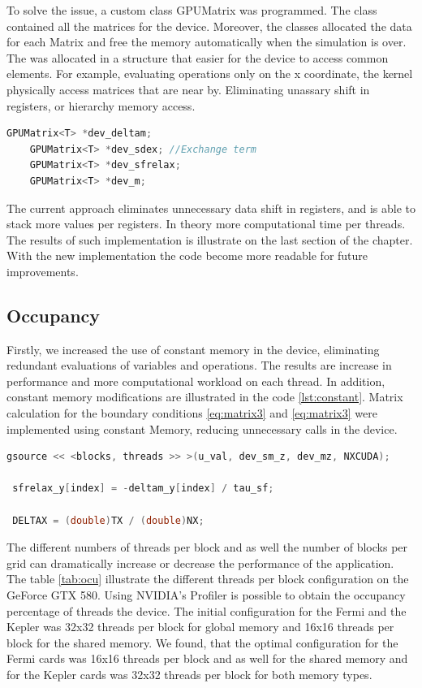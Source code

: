 To solve the issue, a custom class GPUMatrix was programmed. The class contained all the matrices for the device. Moreover, the classes allocated the data for each Matrix and free the memory automatically when the simulation is over. The was allocated in a structure that easier for the device to access common elements. For example, evaluating operations only on the x coordinate, the kernel physically access matrices that are near by. Eliminating unassary shift in registers, or hierarchy memory access.

\begin{lstlisting}[language=C++, caption={SOA implementation}]
    GPUMatrix<T> *dev_deltam;
    GPUMatrix<T> *dev_sdex; //Exchange term
    GPUMatrix<T> *dev_sfrelax;
    GPUMatrix<T> *dev_m; 
\end{lstlisting}

The current approach eliminates unnecessary data shift in registers, and is able to stack more values per registers. In theory more computational time per threads. The results of such implementation is illustrate on the last section of the chapter. With the new implementation the code become more readable for future improvements. 

\subsection{Occupancy}
 
Firstly, we increased the use of constant memory in the device, eliminating redundant evaluations of variables and operations. The results are increase in performance and more computational workload on each thread. In addition, constant memory modifications are illustrated in the code \ref{lst:constant}. Matrix calculation for the boundary conditions \ref{eq:matrix3} and \ref{eq:matrix3} were implemented using constant Memory, reducing unnecessary calls in the device.
 
 \begin{lstlisting}[language=C++,  label={lst:constant}, caption={Constant Memory changes}]
 gsource << <blocks, threads >> >(u_val, dev_sm_z, dev_mz, NXCUDA);
 
 sfrelax_y[index] = -deltam_y[index] / tau_sf;
     
 DELTAX = (double)TX / (double)NX;
\end{lstlisting}
 
The different numbers of threads per block and as well the number of blocks per grid can dramatically increase or decrease the performance of the application. The table \ref{tab:ocu} illustrate the different threads per block configuration on the GeForce GTX 580. Using NVIDIA's Profiler is possible to obtain the occupancy percentage of threads the device. The initial configuration for the Fermi and the Kepler was 32x32 threads per block for global memory and 16x16 threads per block for the shared memory. We found, that the optimal configuration for the Fermi cards was 16x16 threads per block and as well for the shared memory and for the Kepler cards was 32x32 threads per block for both memory types. 

